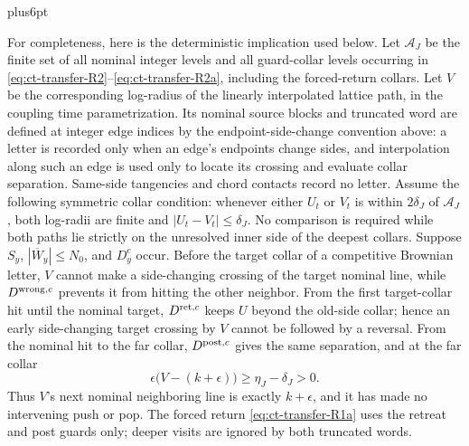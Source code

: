 \documentclass[12pt,reqno]{amsart}
\makeatletter
\theoremstyle{plain}
\theoremstyle{definition}
\theoremstyle{remark}
\renewenvironment{proof}[1][\proofname]{%
  \par
  \pushQED{\qed}%
  \normalfont
  \topsep6pt plus6pt\relax
  \trivlist
  \item[\hskip\labelsep\slshape #1\@addpunct{.}]%
  \ignorespaces
}{%
  \popQED
  \endtrivlist
  \@endpefalse
}
\DeclareRobustCommand{\qed}{%
  \leavevmode\unskip\penalty9999\hbox{}\nobreak
  \ifmmode
    \makebox[0pt][l]{\qquad\hbox{\qedsymbol}}%
  \else
    \qquad\hbox{\qedsymbol}%
  \fi
}
\renewcommand{\qedsymbol}{\rule[.47pt]{4pt}{6pt}}
\numberwithin{equation}{section}
\makeatother
\begin{document}
\begin{proof}[Proof of Lemma~\ref{lem:buffered-transfer}]
For completeness, here is the deterministic implication used below.  Let
$\mathcal A_J$ be the finite set of all nominal integer levels and all
guard-collar levels occurring in \eqref{eq:ct-transfer-R2}--\eqref{eq:ct-transfer-R2a}, including the forced-return
collars.  Let $V$ be the corresponding log-radius of the linearly
interpolated lattice path, in the coupling time parametrization.  Its
nominal source blocks and truncated word are defined at integer edge indices
by the endpoint-side-change convention above: a letter is recorded only
when an edge's endpoints change sides, and interpolation along such an edge
is used only to locate its crossing and evaluate collar separation.
Same-side tangencies and chord contacts record no letter.  Assume the
following symmetric collar condition: whenever either $U_t$ or $V_t$ is
within $2\delta_J$ of $\mathcal A_J$, both log-radii are finite and
$|U_t-V_t|\le\delta_J$.  No comparison is required while both paths lie
strictly on the unresolved inner side of the deepest collars.  Suppose $S_y$,
$|\overline W_y|\le N_0$, and $D_y^c$ occur.  Before the target collar
of a competitive Brownian letter, $V$ cannot make a side-changing crossing
of the target nominal line, while $D^{{\rm wrong},c}$ prevents it from hitting the other
neighbor.  From the first target-collar hit until the nominal target,
$D^{{\rm ret},c}$ keeps $U$ beyond the old-side collar; hence an early
side-changing target crossing by $V$ cannot be followed by a reversal.  From the nominal
hit to the far collar, $D^{{\rm post},c}$ gives the same separation,
and at the far collar
\[
\epsilon\bigl(V-(k+\epsilon)\bigr)
       \ge\eta_J-\delta_J>0.
\]
Thus $V$'s next nominal neighboring line is exactly $k+\epsilon$,
and it has made no intervening push or pop.  The forced return \eqref{eq:ct-transfer-R1a} uses
the retreat and post guards only; deeper visits are ignored by both
truncated words.


\end{proof}
\end{document}
